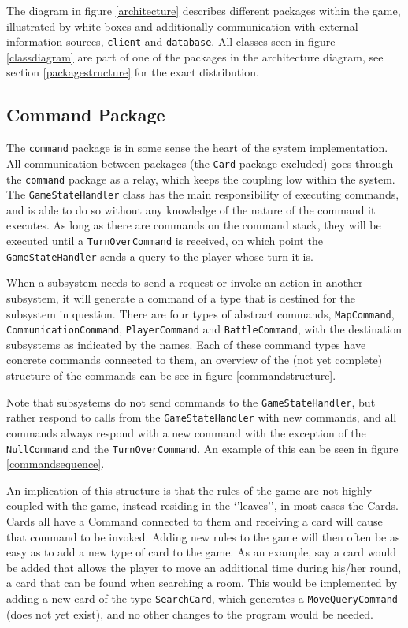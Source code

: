 The diagram in figure \ref{architecture} describes different packages within the game, illustrated by white boxes and additionally communication with external information sources, \texttt{client} and \texttt{database}. All classes seen in figure \ref{classdiagram} are part of one of the packages in the architecture diagram, see section \ref{packagestructure} for the exact distribution.


\subsection{Command Package}
The \texttt{command} package is in some sense the heart of the system implementation. All communication between packages (the \texttt{Card} package excluded) goes through the \texttt{command} package as a relay, which keeps the coupling low within the system. The \texttt{GameStateHandler} class has the main responsibility of executing commands, and is able to do so without any knowledge of the nature of the command it executes. As long as there are commands on the command stack, they will be executed until a \texttt{TurnOverCommand} is received, on which point the \texttt{GameStateHandler} sends a query to the player whose turn it is.

When a subsystem needs to send a request or invoke an action in another subsystem, it will generate a command of a type that is destined for the subsystem in question. There are four types of abstract commands, \texttt{MapCommand}, \texttt{CommunicationCommand}, \texttt{PlayerCommand} and \texttt{BattleCommand}, with the destination subsystems as indicated by the names. Each of these command types have concrete commands connected to them, an overview of the (not yet complete) structure of the commands can be see in figure \ref{commandstructure}.

Note that subsystems do not send commands to the \texttt{GameStateHandler}, but rather respond to calls from the \texttt{GameStateHandler} with new commands, and all commands always respond with a new command with the exception of the \texttt{NullCommand} and the \texttt{TurnOverCommand}. An example of this can be seen in figure \ref{commandsequence}.

An implication of this structure is that the rules of the game are not highly coupled with the game, instead residing in the ‘’leaves’’, in most cases the Cards. Cards all have a Command connected to them and receiving a card will cause that command to be invoked. Adding new rules to the game will then often be as easy as to add a new type of card to the game. As an example, say a card would be added that allows the player to move an additional time during his/her round, a card that can be found when searching a room. This would be implemented by adding a new card of the type \texttt{SearchCard}, which generates a \texttt{MoveQueryCommand} (does not yet exist), and no other changes to the program would be needed.


